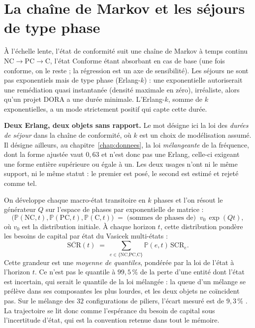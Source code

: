 \section{La chaîne de Markov et les séjours de type phase}

À l'échelle lente, l'état de conformité suit une chaîne de Markov à temps continu
$\text{NC}\to\text{PC}\to\text{C}$, l'état Conforme étant absorbant en cas de base
(une fois conforme, on le reste ; la régression est un axe de sensibilité). Les séjours ne sont
pas exponentiels mais de type phase (Erlang-$k$) : une exponentielle autoriserait une
remédiation quasi instantanée (densité maximale en zéro), irréaliste, alors qu'un projet DORA a
une durée minimale. L'Erlang-$k$, somme de $k$ exponentielles, a un mode strictement positif qui
capte cette durée.

\begin{attention}
\textbf{Deux Erlang, deux objets sans rapport.} Le mot désigne ici la loi des \emph{durées de
séjour} dans la chaîne de conformité, où $k$ est un choix de modélisation assumé. Il désigne
ailleurs, au chapitre~\ref{chap:donnees}, la loi \emph{mélangeante} de la fréquence, dont la
forme ajustée vaut $0{,}63$ et n'est donc pas une Erlang, celle-ci exigeant une forme
entière supérieure ou égale à un. Les deux usages n'ont ni le même support, ni le même statut :
le premier est posé, le second est estimé et rejeté comme tel.
\end{attention} On développe chaque macro-état transitoire en $k$ phases et l'on résout le
générateur $Q$ sur l'espace de phases par exponentielle de matrice :
\begin{equation}
\big(\mathbb P(\text{NC},t),\mathbb P(\text{PC},t),\mathbb P(\text{C},t)\big)
\;=\; \text{(sommes de phases de)}\;\; v_0\,\exp(Qt),
\end{equation}
où $v_0$ est la distribution initiale. À chaque horizon $t$, cette distribution pondère les
besoins de capital par état du Vasicek multi-états :
\begin{equation}
\overline{\mathrm{SCR}}(t)\;=\;\sum_{e\in\{\text{NC,PC,C}\}}\mathbb P(e,t)\,\mathrm{SCR}_e .
\end{equation}
Cette grandeur est une \emph{moyenne de quantiles}, pondérée par la loi de l'état à l'horizon
$t$. Ce n'est pas le quantile à $99{,}5\,\%$ de la perte d'une entité dont l'état est incertain,
qui serait le quantile de la loi mélangée : la queue d'un mélange se prélève dans ses composantes
les plus lourdes, et les deux objets ne coïncident pas. Sur le mélange des $32$ configurations de
piliers, l'écart mesuré est de $9{,}3\,\%$ \matcomp. La
trajectoire se lit donc comme l'espérance du besoin de capital sous l'incertitude d'état, qui est
la convention retenue dans tout le mémoire.

